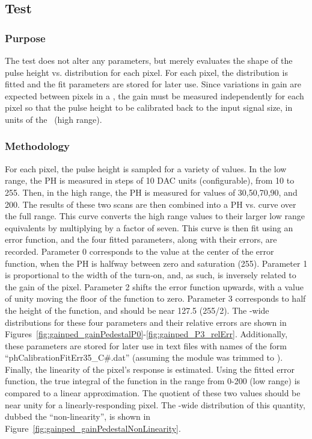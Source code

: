 
\newpage

\subsection{\gainped Test}
\label{ss:gainped}

\subsubsection{Purpose}

The \gainped test does not alter any \dac parameters,
but merely evaluates the shape of the pulse height vs. \vcal distribution for each pixel.
For each pixel, the distribution is fitted and the fit parameters are stored for later use.
Since variations in gain are expected between pixels in a \roc,
the gain must be measured independently for each pixel so that the pulse height to be calibrated back to the input signal size, 
in units of the \vcal~\dac (high range).

\subsubsection{Methodology}

For each pixel, the pulse height is sampled for a variety of \vcal values.
In the low \vcal range, the PH is measured in steps of 10 DAC units (configurable), from 10 to 255.
Then, in the high \vcal range, the PH is measured for values of 30,50,70,90, and 200.
The results of these two scans are then combined into a PH vs. \vcal curve over the full \vcal range.
This curve converts the high range \vcal values to their larger low range equivalents by multiplying by a factor of seven.
This curve is then fit using an error function, and the four fitted parameters, along with their errors, are recorded.
Parameter 0 corresponds to the \vcal value at the center of the error function, when the PH is halfway between zero and saturation (255).
Parameter 1 is proportional to the width of the turn-on, and, as such, is inversely related to the gain of the pixel.
Parameter 2 shifts the error function upwards, with a value of unity moving the floor of the function to zero.
Parameter 3 corresponds to half the height of the function, and should be near 127.5 (255/2).
The \roc-wide distributions for these four parameters 
and their relative errors are shown in Figures~\ref{fig:gainped_gainPedestalP0}-\ref{fig:gainped_P3_relErr}.
Additionally, these parameters are stored for later use in text files with names of the form ``phCalibrationFitErr35\_C\#.dat''
(assuming the module was trimmed to ).
Finally, the linearity of the pixel's response is estimated.
Using the fitted error function, the true integral of the function in the \vcal range from 0-200 (low range) is compared to a linear approximation.
The quotient of these two values should be near unity for a linearly-responding pixel.
The \roc-wide distribution of this quantity, dubbed the ``non-linearity'', is shown in Figure~\ref{fig:gainped_gainPedestalNonLinearity}.

